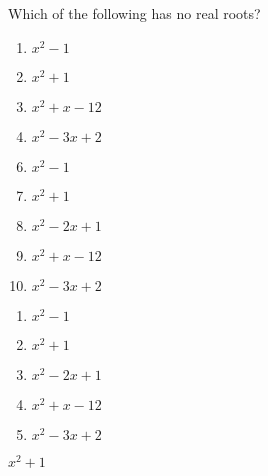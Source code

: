 


 Which of the following has no real roots?


\ifsat
	\begin{enumerate}[label=\Alph*)]
		\item   $x^{2}-1$
		\item  $x^{2}+1$ %
		\item  $x^{2}+x-12$
		\item   $x^{2}-3x+2$
	\end{enumerate}
\else
\fi

\ifacteven
	\begin{enumerate}[label=\textbf{\Alph*.},itemsep=\fill,align=left]
		\setcounter{enumii}{5}
		\item   $x^{2}-1$
		\item  $x^{2}+1$ %
		\item  $x^{2}-2x+1$
		\addtocounter{enumii}{1}
		\item  $x^{2}+x-12$
		\item   $x^{2}-3x+2$
	\end{enumerate}
\else
\fi

\ifactodd
	\begin{enumerate}[label=\textbf{\Alph*.},itemsep=\fill,align=left]
		\item   $x^{2}-1$
		\item  $x^{2}+1$ %
		\item  $x^{2}-2x+1$
		\item  $x^{2}+x-12$
		\item   $x^{2}-3x+2$
	\end{enumerate}
\else
\fi

\ifgridin
  $x^{2}+1$ %
		
\else
\fi

